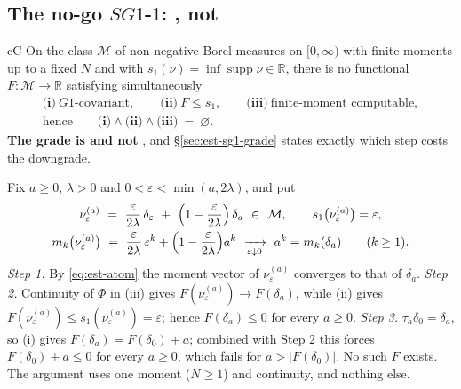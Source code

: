 \subsection{The no-go \texorpdfstring{$SG1$-$1$}{SG1-1}: \texorpdfstring{\LC}{[C]}, not \texorpdfstring{\LT}{[T]}}
\label{sec:est-sg1}

\begin{claimbox}{cC}
 On the class $\mathcal M$ of non-negative Borel
measures on $[0,\infty)$ with finite moments up to a fixed $N$ and with
$s_1(\nu)=\inf\operatorname{supp}\nu\in\mathbb R$, there is no functional
$F:\mathcal M\to\mathbb R$ satisfying simultaneously
\begin{equation}
\begin{gathered}
\textbf{(i)}\ \text{$G1$-covariant},\qquad
\textbf{(ii)}\ F\le s_1,\qquad
\textbf{(iii)}\ \text{finite-moment computable},\\
\text{hence}\qquad
\textbf{(i)}\wedge\textbf{(ii)}\wedge\textbf{(iii)}\ =\ \varnothing .
\end{gathered}
\label{eq:est-sg1}
\end{equation}
\textbf{The grade is \LC{} and not \LT}, and \S\ref{sec:est-sg1-grade} states exactly which step
costs the downgrade.
\end{claimbox}

\begin{proofx}
Fix $a\ge0$, $\lambda>0$ and $0<\varepsilon<\min(a,2\lambda)$, and put
\begin{equation}
\begin{gathered}
\nu_\varepsilon^{(a)}\ =\ \frac{\varepsilon}{2\lambda}\,\delta_\varepsilon
\ +\ \Bigl(1-\frac{\varepsilon}{2\lambda}\Bigr)\,\delta_a\ \in\ \mathcal M ,
\qquad
s_1\bigl(\nu_\varepsilon^{(a)}\bigr)=\varepsilon ,\\
m_k\bigl(\nu_\varepsilon^{(a)}\bigr)\ =\ \frac{\varepsilon}{2\lambda}\,\varepsilon^{k}
+\Bigl(1-\frac{\varepsilon}{2\lambda}\Bigr)a^{k}
\ \xrightarrow[\varepsilon\downarrow0]{}\ a^k=m_k(\delta_a)
\qquad(k\ge1).
\end{gathered}
\label{eq:est-atom}
\end{equation}
\emph{Step 1.} By \eqref{eq:est-atom} the moment vector of $\nu_\varepsilon^{(a)}$ converges to that
of $\delta_a$. \emph{Step 2.} Continuity of $\Phi$ in (iii) gives
$F(\nu_\varepsilon^{(a)})\to F(\delta_a)$, while (ii) gives
$F(\nu_\varepsilon^{(a)})\le s_1(\nu_\varepsilon^{(a)})=\varepsilon$; hence $F(\delta_a)\le0$ for
every $a\ge0$. \emph{Step 3.} $\tau_a\delta_0=\delta_a$, so (i) gives
$F(\delta_a)=F(\delta_0)+a$; combined with Step 2 this forces $F(\delta_0)+a\le0$ for every $a\ge0$,
which fails for $a>|F(\delta_0)|$. No such $F$ exists. The argument uses one moment ($N\ge1$) and
continuity, and nothing else.
\end{proofx}

